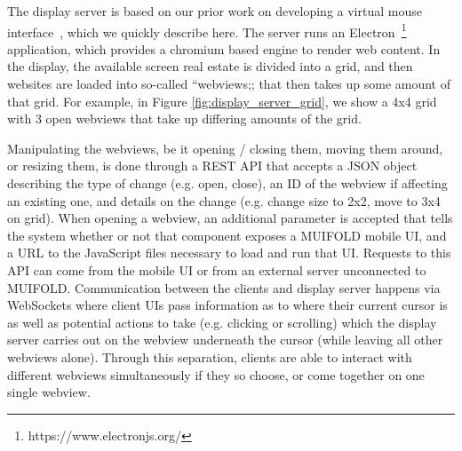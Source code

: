 The display
server is based on our prior work on developing a virtual mouse
interface~\cite{peveler_virtual_2020}, which we quickly describe
here. The server runs an
Electron~\footnote{https://www.electronjs.org/} application, which
provides a chromium based engine to render web content. In the
display, the available screen real estate is divided into a grid,
and then websites are loaded into so-called ``webviews;; that then
takes up some amount of that grid. For example, in Figure
\ref{fig:display_server_grid}, we show a 4x4 grid with 3 open
webviews that take up differing amounts of the grid.

Manipulating the webviews, be it opening / closing them, moving them
around, or resizing them, is done through a REST API that accepts
a JSON object describing the type of change (e.g. open, close), an
ID of the webview if affecting an existing one, and
details on the change (e.g. change size to 2x2, move to 3x4 on grid).
When opening a webview, an additional parameter is accepted that
tells the system whether or not that component exposes a MUIFOLD
mobile UI, and a URL to the JavaScript files necessary to load and
run that UI. Requests to this API can come from the mobile UI or
from an external server unconnected to MUIFOLD. Communication
between the clients and display server happens via WebSockets where
client UIs pass information as to where their current cursor is
as well as potential actions to take (e.g. clicking or scrolling)
which the display server carries out on the webview underneath
the cursor (while leaving all other webviews alone). Through this
separation, clients are able to interact with different webviews
simultaneously if they so choose, or come together on one single
webview.